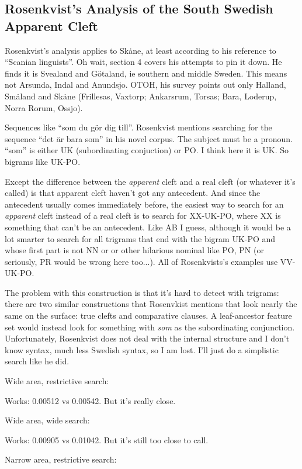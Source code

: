 \subsection{Rosenkvist's Analysis of the South Swedish Apparent Cleft}

Rosenkvist's analysis applies to Sk\.ane, at least according to his
reference to ``Scanian linguists''. Oh wait, section 4 covers his
attempts to pin it down. He finds it is Svealand and G\"otaland, ie
southern and middle Sweden. This means not Arsunda, Indal and
Anundsjo.
OTOH, his survey points out only Halland,
Sm\.aland and Sk\.ane (Frillesas, Vaxtorp; Ankarsrum, Torsas; Bara,
Loderup, Norra Rorum, Ossjo).

Sequences like ``som du g\"or dig till''. Rosenkvist mentions
searching for the sequence ``det \"ar bara som'' in his novel
corpus. The subject must be a pronoun. ``som'' is either UK
(subordinating conjuction) or PO. I think here it is UK. So bigrams
like UK-PO.

Except the difference between the {\it apparent} cleft and a real
cleft (or whatever it's called) is that apparent cleft haven't got any
antecedent. And since the antecedent usually comes immediately before,
the easiest way to search for an {\it apparent} cleft instead of a
real cleft is to search for XX-UK-PO, where XX is something that can't
be an antecedent. Like AB I guess, although it would be a lot smarter
to search for all trigrams that end with the bigram UK-PO and whose
first part is not NN or or other hilarious nominal like PO, PN (or
seriously, PR would be wrong here too...). All of Rosenkvists's
examples use VV-UK-PO.

The problem with this construction is that it's hard to detect with
trigrams: there are two similar constructions that Rosenvkist mentions
that look nearly the same on the surface: true clefts and comparative
clauses. A leaf-ancestor feature set would instead look for something
with {\it som} as the subordinating conjunction. Unfortunately,
Rosenkvist does not deal with the internal structure and I don't know
syntax, much less Swedish syntax, so I am lost. I'll just do a
simplistic search like he did.

Wide area, restrictive search:

Works: 0.00512 vs 0.00542. But it's really close.

Wide area, wide search:

Works: 0.00905 vs 0.01042. But it's still too close to call.

Narrow area, restrictive search:

